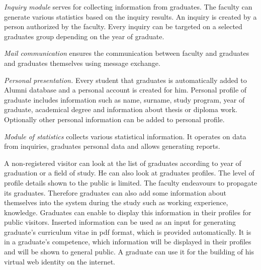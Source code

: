 \documentclass{iitsrc}
\begin{document}
{\em Inquiry module}
serves for collecting information from graduates. The faculty can generate various statistics based on the inquiry results. An inquiry is created by a person authorized by the faculty. Every inquiry can be targeted on a selected graduates group depending on the year of graduate.

{\em Mail communication} ensures the communication between faculty and graduates and graduates themselves using message exchange.

{\em Personal presentation.}
Every student that graduates is automatically added to Alumni database and a personal account is created for him. Personal profile of graduate includes information such as name, surname, study program, year of graduate, academical degree and information about thesis or diploma work. Optionally other personal information can be added to personal profile. 

{\em Module of statistics}
collects various statistical information. It operates on data from inquiries, graduates personal data and allows generating reports. 

A non-registered visitor can look at the list of graduates according to year of graduation or a field of study. He can also look at graduates profiles. The level of profile details shown to the public is limited. The faculty endeavours to propagate its graduates. Therefore graduates can also add some information about themselves into the system during the study such as working experience, knowledge. Graduates can enable to display this information in their profiles for public visitors. Inserted information can be used as an input for generating graduate's curriculum vitae in pdf format, which is provided automatically. It is in a graduate's competence, which information will be displayed in their profiles and will be shown to general public. A graduate can use it for the building of his virtual web identity on the internet. 


\nocite{team14}
\nocite{team15}



\end{document}
